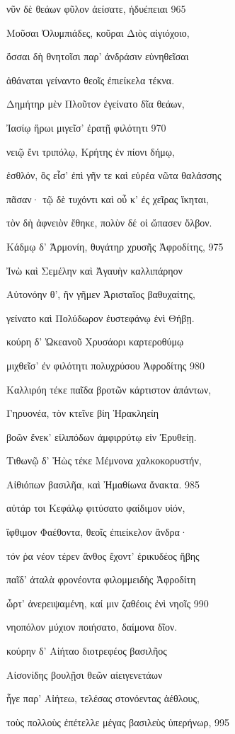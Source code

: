 νῦν δὲ θεάων φῦλον ἀείσατε, ἡδυέπειαι \num{965}

Μοῦσαι Ὀλυμπιάδες, κοῦραι Διὸς αἰγιόχοιο,

ὅσσαι δὴ θνητοῖσι παρ' ἀνδράσιν εὐνηθεῖσαι

ἀθάναται γείναντο θεοῖς ἐπιείκελα τέκνα.

Δημήτηρ μὲν Πλοῦτον ἐγείνατο δῖα θεάων,

Ἰασίῳ ἥρωι μιγεῖσ' ἐρατῇ φιλότητι \num{970} 

νειῷ ἔνι τριπόλῳ, Κρήτης ἐν πίονι δήμῳ,

ἐσθλόν, ὃς εἶσ' ἐπὶ γῆν τε καὶ εὐρέα νῶτα θαλάσσης

πᾶσαν· τῷ δὲ τυχόντι καὶ οὗ κ' ἐς χεῖρας ἵκηται, 

τὸν δὴ ἀφνειὸν ἔθηκε, πολὺν δέ οἱ ὤπασεν ὄλβον.

Κάδμῳ δ' Ἁρμονίη, θυγάτηρ χρυσῆς Ἀφροδίτης, \num{975}

Ἰνὼ καὶ Σεμέλην καὶ Ἀγαυὴν καλλιπάρηον 

Αὐτονόην θ', ἣν γῆμεν Ἀρισταῖος βαθυχαίτης,

γείνατο καὶ Πολύδωρον ἐυστεφάνῳ ἐνὶ Θήβῃ.

κούρη δ' Ὠκεανοῦ Χρυσάορι καρτεροθύμῳ

μιχθεῖσ' ἐν φιλότητι πολυχρύσου Ἀφροδίτης \num{980}

Καλλιρόη τέκε παῖδα βροτῶν κάρτιστον ἁπάντων,

Γηρυονέα, τὸν κτεῖνε βίη Ἡρακληείη

βοῶν ἕνεκ' εἰλιπόδων ἀμφιρρύτῳ εἰν Ἐρυθείῃ.

Τιθωνῷ δ' Ἠὼς τέκε Μέμνονα χαλκοκορυστήν,

Αἰθιόπων βασιλῆα, καὶ Ἠμαθίωνα ἄνακτα. \num{985}

αὐτάρ τοι Κεφάλῳ φιτύσατο φαίδιμον υἱόν, 

ἴφθιμον Φαέθοντα, θεοῖς ἐπιείκελον ἄνδρα· 

τόν ῥα νέον τέρεν ἄνθος ἔχοντ' ἐρικυδέος ἥβης

παῖδ' ἀταλὰ φρονέοντα φιλομμειδὴς Ἀφροδίτη

ὦρτ' ἀνερειψαμένη, καί μιν ζαθέοις ἐνὶ νηοῖς \num{990} 

νηοπόλον μύχιον ποιήσατο, δαίμονα δῖον. 

κούρην δ' Αἰήταο διοτρεφέος βασιλῆος

Αἰσονίδης βουλῇσι θεῶν αἰειγενετάων

ἦγε παρ' Αἰήτεω, τελέσας στονόεντας ἀέθλους,

τοὺς πολλοὺς ἐπέτελλε μέγας βασιλεὺς ὑπερήνωρ, \num{995}

